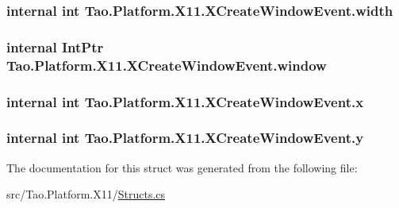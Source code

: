 \label{struct_tao_1_1_platform_1_1_x11_1_1_x_create_window_event_a7f7b06b3214897db284d5ca44d7a7d05}
\hypertarget{struct_tao_1_1_platform_1_1_x11_1_1_x_create_window_event_aacf292b8ddc0715e2327e465c1e1e1bf}{
\subsubsection[{width}]{\setlength{\rightskip}{0pt plus 5cm}internal int {\bf Tao.Platform.X11.XCreateWindowEvent.width}}}
\label{struct_tao_1_1_platform_1_1_x11_1_1_x_create_window_event_aacf292b8ddc0715e2327e465c1e1e1bf}
\hypertarget{struct_tao_1_1_platform_1_1_x11_1_1_x_create_window_event_a3bfe28bf2cb14358e726ae7d5f4df991}{
\subsubsection[{window}]{\setlength{\rightskip}{0pt plus 5cm}internal IntPtr {\bf Tao.Platform.X11.XCreateWindowEvent.window}}}
\label{struct_tao_1_1_platform_1_1_x11_1_1_x_create_window_event_a3bfe28bf2cb14358e726ae7d5f4df991}
\hypertarget{struct_tao_1_1_platform_1_1_x11_1_1_x_create_window_event_ae2887d9ab88086aaeac655a0ac17d82a}{
\subsubsection[{x}]{\setlength{\rightskip}{0pt plus 5cm}internal int {\bf Tao.Platform.X11.XCreateWindowEvent.x}}}
\label{struct_tao_1_1_platform_1_1_x11_1_1_x_create_window_event_ae2887d9ab88086aaeac655a0ac17d82a}
\hypertarget{struct_tao_1_1_platform_1_1_x11_1_1_x_create_window_event_ad0814c3f574061aa9f6eafe6e74c2c3a}{
\subsubsection[{y}]{\setlength{\rightskip}{0pt plus 5cm}internal int {\bf Tao.Platform.X11.XCreateWindowEvent.y}}}
\label{struct_tao_1_1_platform_1_1_x11_1_1_x_create_window_event_ad0814c3f574061aa9f6eafe6e74c2c3a}


The documentation for this struct was generated from the following file:\begin{DoxyCompactItemize}
\item 
src/Tao.Platform.X11/\hyperlink{_structs_8cs}{Structs.cs}\end{DoxyCompactItemize}
